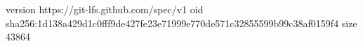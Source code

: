 version https://git-lfs.github.com/spec/v1
oid sha256:1d138a429d1c0fff9de427fe23e71999e770de571c32855599b99c38af0159f4
size 43864
